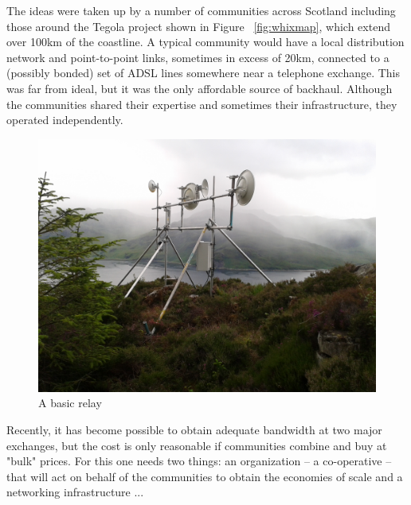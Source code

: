 The ideas were taken up by a number of communities across Scotland including those around the Tegola project shown in Figure ~\ref{fig:whixmap}, which extend over 100km of the coastline. A typical community would have a local distribution network and point-to-point links, sometimes in excess of 20km, connected to a (possibly bonded) set of ADSL lines somewhere near a telephone exchange. This was far from ideal, but it was the only affordable source of backhaul. Although the communities shared their expertise and sometimes their infrastructure, they operated independently.
\begin{figure}[h]
\centering
 \includegraphics[width=\columnwidth]{figs/mhialairigh-from-behind}
 \caption{A basic relay}
\label{fig:mhialairigh}
\end{figure}

Recently, it has become possible to obtain adequate bandwidth at two major exchanges, but the cost is only reasonable if communities combine and buy at "bulk" prices.  For this one needs two things: an organization -- a co-operative -- that will act on behalf of the communities to obtain the economies of scale and a networking infrastructure ...

